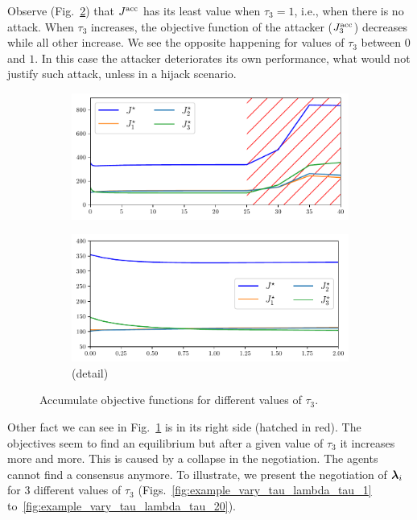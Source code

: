 \documentclass[../main.tex]{subfiles}
\begin{document}
Observe (Fig.~\ref{fig:example_vary_tau_objective_detail}) that $\Jacc$ has its least value when $\tau_{3}=1$, i.e., when there is no attack.
When $\tau_{3}$ increases, the objective function of the attacker ($\Jiacc[3]$) decreases while all other increase.
We see the opposite happening for values of $\tau_{3}$ between $0$ and $1$.
In this case the attacker deteriorates its own performance, what would not justify such attack, unless in a hijack scenario.

\begin{figure}[h]
  \centering
  \begin{subfigure}{0.50\textwidth}
    \includegraphics[width=\textwidth]{../img/example_primal_decomposition/example_vary_tau_J.pdf}
    \caption{}\label{fig:example_vary_tau_objective}
  \end{subfigure}
  \begin{subfigure}{0.3\textwidth}
    \includegraphics[width=\textwidth]{../img/example_primal_decomposition/example_vary_tau_J_detail.pdf}
    \caption{(detail)}\label{fig:example_vary_tau_objective_detail}
  \end{subfigure}
  \caption{Accumulate objective functions for different values of $\tau_{3}$.}\label{fig:example_vary_tau_objective_both}
\end{figure}

Other fact we can see in Fig.~\ref{fig:example_vary_tau_objective} is in its right side (hatched in red). The objectives seem to find an equilibrium but after a given value of $\tau_{3}$ it increases more and more.
This is caused by a collapse in the negotiation.
The agents cannot find a consensus anymore.
To illustrate, we present the negotiation of $\lambdai$ for $3$ different values of $\tau_{3}$ (Figs.~\ref{fig:example_vary_tau_lambda_tau_1} to~\ref{fig:example_vary_tau_lambda_tau_20}).
\end{document}
